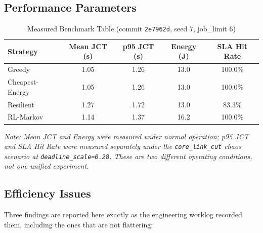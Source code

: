 \documentclass[12pt,a4]{report}
\begin{document}
\subsection{Performance Parameters}
\label{sec:performance-parameters}

\begin{table}[H]
\centering
\caption{Measured Benchmark Table (commit \texttt{2e7962d}, seed 7, job\_limit 6)}
\label{tab:performance-parameters}
\begin{tabular}{|l|c|c|c|c|}
\hline
\textbf{Strategy} & \textbf{Mean JCT (s)} & \textbf{p95 JCT (s)} & \textbf{Energy (J)} & \textbf{SLA Hit Rate} \\
\hline
Greedy & 1.05 & 1.26 & 13.0 & 100.0\% \\
Cheapest-Energy & 1.05 & 1.26 & 13.0 & 100.0\% \\
Resilient & 1.27 & 1.72 & 13.0 & 83.3\% \\
RL-Markov & 1.14 & 1.37 & 16.2 & 100.0\% \\
\hline
\end{tabular}
\end{table}

\noindent\textit{Note: Mean JCT and Energy were measured under normal operation; p95 JCT and SLA Hit Rate were measured separately under the \texttt{core\_link\_cut} chaos scenario at \texttt{deadline\_scale=0.28}. These are two different operating conditions, not one unified experiment.}

\subsection{Efficiency Issues}

Three findings are reported here exactly as the engineering worklog recorded them, including the ones that are not flattering:
\end{document}
